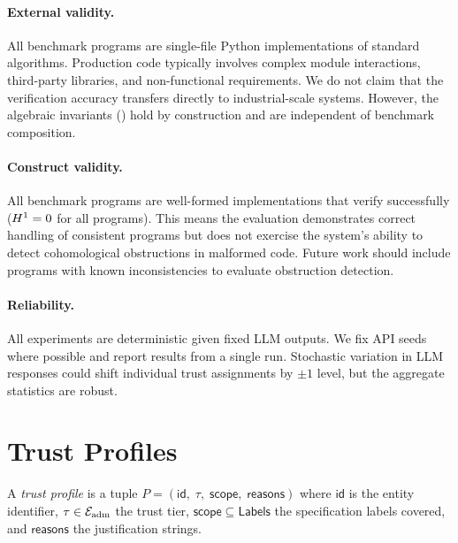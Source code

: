 \documentclass[11pt]{article}
\begin{document}
\paragraph{External validity.}
All benchmark programs are single-file Python implementations
of standard algorithms.  Production code typically involves
complex module interactions, third-party libraries, and
non-functional requirements.  We do not claim that the
\compOverallAccuracy{} verification accuracy transfers directly to
industrial-scale systems.  However, the algebraic invariants
() hold by construction and are independent
of benchmark composition.

\paragraph{Construct validity.}
All benchmark programs are well-formed implementations that
verify successfully ($H^{1} = 0$ for all programs).
This means the evaluation demonstrates correct handling of
consistent programs but does not exercise the system's
ability to detect cohomological obstructions in malformed
code.  Future work should include programs with known
inconsistencies to evaluate obstruction detection.

\paragraph{Reliability.}
All experiments are deterministic given fixed LLM outputs.
We fix API seeds where possible and report results from
a single run.  Stochastic variation in LLM responses
could shift individual trust assignments by $\pm 1$ level,
but the aggregate statistics are robust.


\section{Trust Profiles}\label{sec:profiles}

\begin{definition}\label{def:profile}
A \emph{trust profile} is a tuple
$P = (\mathsf{id},\;\tau,\;\mathsf{scope},\;\mathsf{reasons})$
where $\mathsf{id}$ is the entity identifier,
$\tau \in \mathcal{E}_{\mathrm{adm}}$ the trust tier,
$\mathsf{scope} \subseteq \mathsf{Labels}$ the specification
labels covered, and $\mathsf{reasons}$ the justification strings.
\end{definition}
\end{document}
